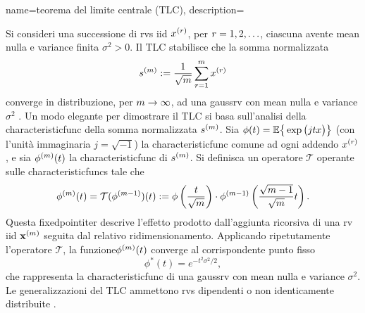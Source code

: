 {name={teorema del limite centrale (TLC)},
	description={Si consideri una successione di \glspl{rv} \gls{iid} \( x^{(r)} \), per \( r = 1, 2, \ldots \), 
		ciascuna avente \gls{mean} nulla e \gls{variance} finita \( \sigma^2 > 0 \). 
		Il  TLC stabilisce che la somma normalizzata 
		\[
		s^{(m)} := \frac{1}{\sqrt{m}} \sum_{r = 1}^{m} x^{(r)} 
		\]
		converge in distribuzione, per \( m \to \infty \), ad una \gls{gaussrv} con \gls{mean} nulla 
		e \gls{variance} \( \sigma^2 \) \cite[Proposition~2.17]{AsympVanderVaartBook}.
		Un modo elegante per dimostrare il TLC si basa sull’analisi della \gls{characteristicfunc} della somma normalizzata \( s^{(m)} \). 
		Sia $ \phi(t) = \mathbb{E} \big\{ \exp \big( j t x \big) \big\}$ (con l'unità immaginaria $j = \sqrt{-1}$) 
		la \gls{characteristicfunc} comune ad ogni addendo $x^{(r)}$, e sia \( \phi^{(m)}(t) \) 
		la \gls{characteristicfunc} di \( s^{(m)} \). Si definisca un operatore \( \mathcal{T} \) operante sulle \glspl{characteristicfunc} 
		tale che
		\[
		\phi^{(m)}(t) = \mathcal{T}(\phi^{(m-1)})(t) := \phi\left( \frac{t}{\sqrt{m}} \right) \cdot \phi^{(m-1)}\left( \frac{\sqrt{m-1}}{\sqrt{m}} t \right).
		\]
		Questa \gls{fixedpointiter} descrive l’effetto prodotto dall’aggiunta ricorsiva di una \gls{rv} \gls{iid} ${\bf x}^{(m)}$ 
		seguita dal relativo ridimensionamento. Applicando ripetutamente l’operatore \( \mathcal{T} \), la funzione\( \phi^{(m)}(t) \) 
		converge al corrispondente punto fisso
		\[
		\phi^*(t) = e^{-t^2 \sigma^2 / 2},
		\]
		che rappresenta la \gls{characteristicfunc} di una \gls{gaussrv} con \gls{mean} nulla e \gls{variance} 
		\( \sigma^2 \). Le generalizzazioni del TLC ammettono \glspl{rv} dipendenti o non identicamente distribuite \cite[Section~2.8]{AsympVanderVaartBook}.
\begin{figure}
	\centering
\end{figure}}}
